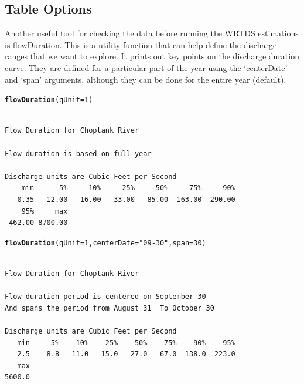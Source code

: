 \documentclass[a4paper,11pt]{article}\usepackage[]{graphicx}\usepackage[]{color}
\makeatletter
\newcommand{\hlnum}[1]{\textcolor[rgb]{0.686,0.059,0.569}{#1}}%
\newcommand{\hlstr}[1]{\textcolor[rgb]{0.192,0.494,0.8}{#1}}%
\newcommand{\hlstd}[1]{\textcolor[rgb]{0.345,0.345,0.345}{#1}}%
\newcommand{\hlkwc}[1]{\textcolor[rgb]{0.333,0.667,0.333}{#1}}%
\newcommand{\hlkwd}[1]{\textcolor[rgb]{0.737,0.353,0.396}{\textbf{#1}}}%
\newenvironment{kframe}{%
 \def\at@end@of@kframe{}%
 \ifinner\ifhmode%
  \def\at@end@of@kframe{\end{minipage}}%
  \begin{minipage}{\columnwidth}%
 \fi\fi%
 \def\FrameCommand##1{\hskip\@totalleftmargin \hskip-\fboxsep
 \colorbox{shadecolor}{##1}\hskip-\fboxsep
     \hskip-\linewidth \hskip-\@totalleftmargin \hskip\columnwidth}%
 \MakeFramed {\advance\hsize-\width
   \@totalleftmargin\z@ \linewidth\hsize
   \@setminipage}}%
 {\par\unskip\endMakeFramed%
 \at@end@of@kframe}
\newenvironment{knitrout}{}{} %
\makeatother
\begin{document}
\subsection{Table Options}
\label{sec:tableOptionsWQ}
Another useful tool for checking the data before running the WRTDS estimations is flowDuration. This is a utility function that can help define the discharge ranges that we want to explore.  It prints out key points on the discharge duration curve.  They are defined for a particular part of the year using the `centerDate' and `span' arguments, although they can be done for the entire year (default).  

\begin{knitrout}
\color{fgcolor}\begin{kframe}
\begin{alltt}
\hlkwd{flowDuration}\hlstd{(}\hlkwc{qUnit}\hlstd{=}\hlnum{1}\hlstd{)}
\end{alltt}
\begin{verbatim}

Flow Duration for Choptank River 

Flow duration is based on full year

Discharge units are Cubic Feet per Second 
    min      5%     10%     25%     50%     75%     90% 
   0.35   12.00   16.00   33.00   85.00  163.00  290.00 
    95%     max 
 462.00 8700.00 
\end{verbatim}
\begin{alltt}
\hlkwd{flowDuration}\hlstd{(}\hlkwc{qUnit}\hlstd{=}\hlnum{1}\hlstd{,} \hlkwc{centerDate}\hlstd{=}\hlstr{"09-30"}\hlstd{,} \hlkwc{span}\hlstd{=}\hlnum{30}\hlstd{)}
\end{alltt}
\begin{verbatim}

Flow Duration for Choptank River 

Flow duration period is centered on September 30 
And spans the period from August 31  To October 30

Discharge units are Cubic Feet per Second 
   min     5%    10%    25%    50%    75%    90%    95% 
   2.5    8.8   11.0   15.0   27.0   67.0  138.0  223.0 
   max 
5600.0 
\end{verbatim}
\end{kframe}
\end{knitrout}


\FloatBarrier
\end{document}
